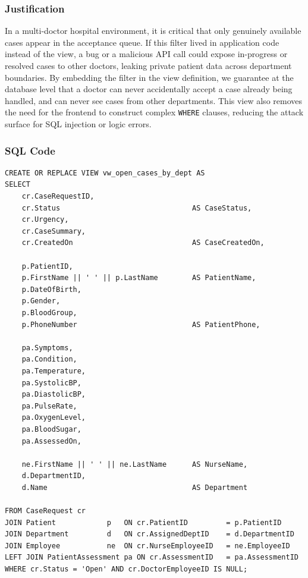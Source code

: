 \documentclass{article}
\begin{document}
\subsubsection{Justification}
In a multi-doctor hospital environment, it is critical that only genuinely available cases appear in the acceptance queue. If this filter lived in application code instead of the view, a bug or a malicious API call could expose in-progress or resolved cases to other doctors, leaking private patient data across department boundaries. By embedding the filter in the view definition, we guarantee at the database level that a doctor can never accidentally accept a case already being handled, and can never see cases from other departments. This view also removes the need for the frontend to construct complex \texttt{WHERE} clauses, reducing the attack surface for SQL injection or logic errors.

\subsubsection{SQL Code}

\begin{lstlisting}
CREATE OR REPLACE VIEW vw_open_cases_by_dept AS
SELECT
    cr.CaseRequestID,
    cr.Status                               AS CaseStatus,
    cr.Urgency,
    cr.CaseSummary,
    cr.CreatedOn                            AS CaseCreatedOn,

    p.PatientID,
    p.FirstName || ' ' || p.LastName        AS PatientName,
    p.DateOfBirth,
    p.Gender,
    p.BloodGroup,
    p.PhoneNumber                           AS PatientPhone,

    pa.Symptoms,
    pa.Condition,
    pa.Temperature,
    pa.SystolicBP,
    pa.DiastolicBP,
    pa.PulseRate,
    pa.OxygenLevel,
    pa.BloodSugar,
    pa.AssessedOn,

    ne.FirstName || ' ' || ne.LastName      AS NurseName,
    d.DepartmentID,
    d.Name                                  AS Department

FROM CaseRequest cr
JOIN Patient            p   ON cr.PatientID         = p.PatientID
JOIN Department         d   ON cr.AssignedDeptID    = d.DepartmentID
JOIN Employee           ne  ON cr.NurseEmployeeID   = ne.EmployeeID
LEFT JOIN PatientAssessment pa ON cr.AssessmentID   = pa.AssessmentID
WHERE cr.Status = 'Open' AND cr.DoctorEmployeeID IS NULL;
\end{lstlisting}

\end{document}
